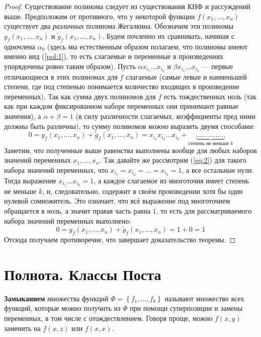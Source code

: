 \documentclass[11pt]{article}
\begin{document}
\begin{proof}
    Существование полинома следует из существования КНФ и рассуждений выше.
    Предположим от противного, что у некоторой функции $f(x_1, \ldots, x_n)$ существует два \textit{различных}
    полинома Жегалкина. Обозначим эти полиномы $g_f(x_1, \ldots, x_n)$ и $\widetilde{g}_f(x_1, \ldots, x_n)$.
    Будем почленно их сравнивать, начиная с одночлена $\alpha_0$ (здесь мы естественным образом полагаем, что полиномы 
    имеют именно вид (\ref{pol:1}), то есть слагаемые и переменные в произведениях упорядочены ровно таким образом).
    Пусть $\alpha x_{i_1} \ldots x_{i_k}$ и $\beta x_{i_1} \ldots x_{i_k}$ --- первые отличающиеся в этих полиномах для $f$ слагаемые (самые левые и наименьшей степени, где под степенью понимается количество входящих в произведение переменных).
    Так как сумма двух полиномов для $f$ есть тождественных ноль (так как при каждом фиксированном наборе переменных они принимают равные значения), а $\alpha + \beta = 1$ (в силу различности слагаемых, коэффициенты пред ними должны быть различны),
    то сумму полиномов можно выразить двумя способами:
    \begin{equation*} \label{eq:2} \tag{$\star$}
        0 = g_f(x_1, \ldots, x_n) + \widetilde{g}_f(x_1, \ldots, x_n) = x_{i_1} x_{i_2} \ldots x_{i_k} + \underbrace{\ldots \ldots \ldots \ldots \ldots}_{\text{степень не меньше } k}
    \end{equation*}
    Заметим, что полученные выше равенства выполнены вообще для любых наборов значений переменных $x_1, \ldots, x_n$.
    Так давайте же рассмотрим (\ref{eq:2}) для такого набора значений переменных, что $x_{i_1} = x_{i_2} = \ldots = x_{i_k} = 1$, а все остальные нули.
    Тогда выражение $x_{i_1} \ldots x_{i_k} = 1$, а каждое слагаемое из многоточия имеет степень не меньше $k$, и, следовательно, содержит в своём произведении хотя бы один нулевой сомножитель.
    Это означает, что всё выражение под многоточием обращается в ноль, а значит правая часть равна $1$, то есть для рассматриваемого набора значений переменных выполнено:
    \[0 = g_f(x_1, \ldots, x_n) + \widetilde{g}_f(x_1, \ldots, x_n) = 1 + 0 = 1\]
    Отсюда получаем противоречие, что завершает доказательство теоремы.
\end{proof}

\section{Полнота. Классы Поста}

\begin{definition}
    \textbf{Замыканием} множества функций $\Phi = \left\{f_1, \ldots, f_k\right\}$ называют 
    множество всех функций, которые можно получить из $\Phi$ при помощи суперпозиции и замены переменных, 
    в том числе с отождествлением. Говоря проще, можно $f(x, y)$ заменить на $f(x, z)$ или $f(x, x)$.
\end{definition}
\end{document}
